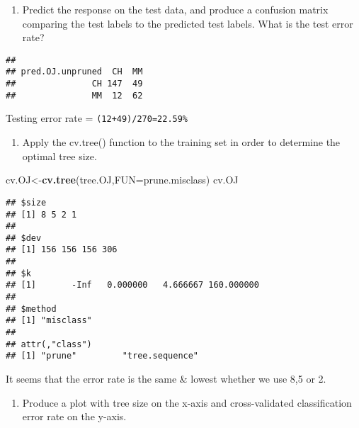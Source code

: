 \documentclass[]{article}
\newenvironment{Shaded}{\begin{snugshade}}{\end{snugshade}}
\newcommand{\KeywordTok}[1]{\textcolor[rgb]{0.13,0.29,0.53}{\textbf{#1}}}
\newcommand{\DataTypeTok}[1]{\textcolor[rgb]{0.13,0.29,0.53}{#1}}
\newcommand{\StringTok}[1]{\textcolor[rgb]{0.31,0.60,0.02}{#1}}
\newcommand{\OperatorTok}[1]{\textcolor[rgb]{0.81,0.36,0.00}{\textbf{#1}}}
\newcommand{\NormalTok}[1]{#1}
\providecommand{\tightlist}{%
  \setlength{\itemsep}{0pt}\setlength{\parskip}{0pt}}
\begin{document}
\begin{enumerate}
\def\labelenumi{(\alph{enumi})}
\setcounter{enumi}{4}
\tightlist
\item
  Predict the response on the test data, and produce a confusion matrix
  comparing the test labels to the predicted test labels. What is the
  test error rate?
\end{enumerate}

\begin{Shaded}
\end{Shaded}

\begin{verbatim}
##                 
## pred.OJ.unpruned  CH  MM
##               CH 147  49
##               MM  12  62
\end{verbatim}

Testing error rate = \texttt{(12+49)/270=22.59\%}

\begin{enumerate}
\def\labelenumi{(\alph{enumi})}
\setcounter{enumi}{5}
\tightlist
\item
  Apply the cv.tree() function to the training set in order to determine
  the optimal tree size.
\end{enumerate}

\begin{Shaded}
\begin{Highlighting}[]
\NormalTok{cv.OJ<-}\KeywordTok{cv.tree}\NormalTok{(tree.OJ,}\DataTypeTok{FUN=}\NormalTok{prune.misclass)}
\NormalTok{cv.OJ}
\end{Highlighting}
\end{Shaded}

\begin{verbatim}
## $size
## [1] 8 5 2 1
## 
## $dev
## [1] 156 156 156 306
## 
## $k
## [1]       -Inf   0.000000   4.666667 160.000000
## 
## $method
## [1] "misclass"
## 
## attr(,"class")
## [1] "prune"         "tree.sequence"
\end{verbatim}

It seems that the error rate is the same \& lowest whether we use 8,5 or
2.

\begin{enumerate}
\def\labelenumi{(\alph{enumi})}
\setcounter{enumi}{6}
\tightlist
\item
  Produce a plot with tree size on the x-axis and cross-validated
  classification error rate on the y-axis.
\end{enumerate}
\end{document}
